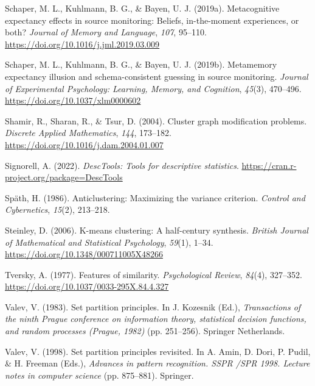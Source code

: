\documentclass[
  man,floatsintext]{apa7}
\newlength{\cslhangindent}
\newlength{\cslentryspacingunit} %
\newenvironment{CSLReferences}[2] %
 {%
  \setlength{\parindent}{0pt}
  \ifodd #1
  \let\oldpar\par
  \def\par{\hangindent=\cslhangindent\oldpar}
  \fi
  \setlength{\parskip}{#2\cslentryspacingunit}
 }%
 {}
\begin{document}
\begin{CSLReferences}{1}{0}
\leavevmode{}%
Schaper, M. L., Kuhlmann, B. G., \& Bayen, U. J. (2019a). Metacognitive expectancy effects in source monitoring: Beliefs, in-the-moment experiences, or both? \emph{Journal of Memory and Language}, \emph{107}, 95--110. \url{https://doi.org/10.1016/j.jml.2019.03.009}

\leavevmode{}%
Schaper, M. L., Kuhlmann, B. G., \& Bayen, U. J. (2019b). Metamemory expectancy illusion and schema-consistent guessing in source monitoring. \emph{Journal of Experimental Psychology: Learning, Memory, and Cognition}, \emph{45}(3), 470--496. \url{https://doi.org/10.1037/xlm0000602}

\leavevmode{}%
Shamir, R., Sharan, R., \& Tsur, D. (2004). {Cluster graph modification problems}. \emph{Discrete Applied Mathematics}, \emph{144}, 173--182. \url{https://doi.org/10.1016/j.dam.2004.01.007}

\leavevmode{}%
Signorell, A. (2022). \emph{{DescTools}: Tools for descriptive statistics}. \url{https://cran.r-project.org/package=DescTools}

\leavevmode{}%
Späth, H. (1986). Anticlustering: Maximizing the variance criterion. \emph{Control and Cybernetics}, \emph{15}(2), 213--218.

\leavevmode{}%
Steinley, D. (2006). K-means clustering: A half-century synthesis. \emph{British Journal of Mathematical and Statistical Psychology}, \emph{59}(1), 1--34. \url{https://doi.org/10.1348/000711005X48266}

\leavevmode{}%
Tversky, A. (1977). Features of similarity. \emph{Psychological Review}, \emph{84}(4), 327--352. \url{https://doi.org/10.1037/0033-295X.84.4.327}

\leavevmode{}%
Valev, V. (1983). Set partition principles. In J. Kozesnik (Ed.), \emph{Transactions of the ninth {Prague} conference on information theory, statistical decision functions, and random processes ({Prague}, 1982)} (pp. 251--256). Springer Netherlands.

\leavevmode{}%
Valev, V. (1998). Set partition principles revisited. In A. Amin, D. Dori, P. Pudil, \& H. Freeman (Eds.), \emph{Advances in pattern recognition. {SSPR /SPR 1998}. Lecture notes in computer science} (pp. 875--881). Springer.


\end{CSLReferences}
\end{document}
